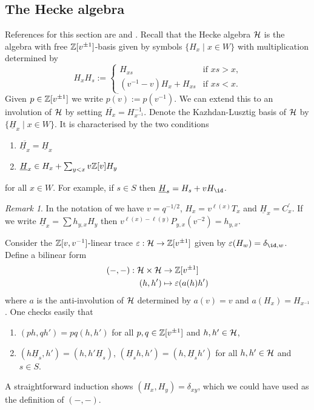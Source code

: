 \documentclass[11pt]{amsart}
\numberwithin{equation}{section}
\def\e{\varepsilon}
\def\ov{\overline}
\def\un{\underline}
\def\to{\rightarrow}
\theoremstyle{definition}
\theoremstyle{remark}
\newtheorem{remark}[thm]{Remark}
\begin{document}
\subsection{The Hecke algebra} \label{sec:hecke}
References for this section are \cite{KL1} and \cite{SoKL}.
Recall that the Hecke algebra ${\mathcal{H}}$ is the algebra with free ${\mathbb{Z}}[v^{\pm 1}]$-basis given by symbols $\{ H_x \; | \; x \in W \}$ with multiplication determined by \[ H_xH_s :=
\begin{cases} H_{xs} & \text{if $xs > x$,} \\ (v^{-1} - v)H_x + H_{xs} & \text{if $xs < x$.} \end{cases} \] Given $p \in {\mathbb{Z}}[v^{\pm 1}]$ we write $\ov{p(v)} := p(v^{-1})$. We can
extend this to an involution of ${\mathcal{H}}$ by setting $\ov{H_x} = H^{-1}_{x^{-1}}$. Denote the Kazhdan-Lusztig basis of ${\mathcal{H}}$ by $\{ \un{H}_x \; | \; x \in W \}$. It is characterised by
the two conditions
 \begin{enumerate} \item[i)] $\ov{\un{H}_x} = \un{H}_x$ \item[ii)] $\un{H}_x \in H_x + \sum_{y < x} v\ZM [v]H_y$ \end{enumerate}
for all $x \in W$. For example, if $s
\in S$ then $\un{H}_s = H_s + vH_{\id}$.


\begin{remark} \label{rem:oldKL}
  In the notation of \cite{KL1} we have $v = q^{-1/2}$, $H_x =
  v^{\ell(x)}T_x$ and $\un{H}_x = C_x^\prime$.  If we write $\un{H}_x = \sum h_{y,x}H_y$ then
  $v^{\ell(x)-\ell(y)}P_{y,x}(v^{-2}) = h_{y,x}$.
\end{remark}

Consider the ${\mathbb{Z}}[v,v^{-1}]$-linear trace $\e : \HC \to \ZM[v^{\pm
  1}]$ given by $\e(H_w)= \delta_{\id,w}$. Define a bilinear form 
\begin{align*}
(-,-): \HC \times \HC & \to \ZM[v^{\pm 1}] \\
(h,h') & \mapsto\e(a(h)h')
\end{align*}
where $a$ is the anti-involution of ${\mathcal{H}}$ determined by $a(v) = v$ and
$a(H_x) = H_{x^{-1}}$. One checks easily that
\begin{enumerate}
\item[i)] $(ph, qh') = {p}q(h,h')$ for all $p, q \in
  {\mathbb{Z}}[v^{\pm 1}]$ and $h,h' \in {\mathcal{H}}$,
\item[ii)] $(h\un{H}_s, h') = (h, h'\un{H}_s)$, $(\un{H}_sh, h') = (h,
  \un{H}_sh')$ for all $h, h' \in {\mathcal{H}}$ and $s \in S$.
\end{enumerate}
A straightforward induction shows $(H_x,
H_y) =  \delta_{xy}$, which we could have used as the
definition of $(-,-)$.
\end{document}
